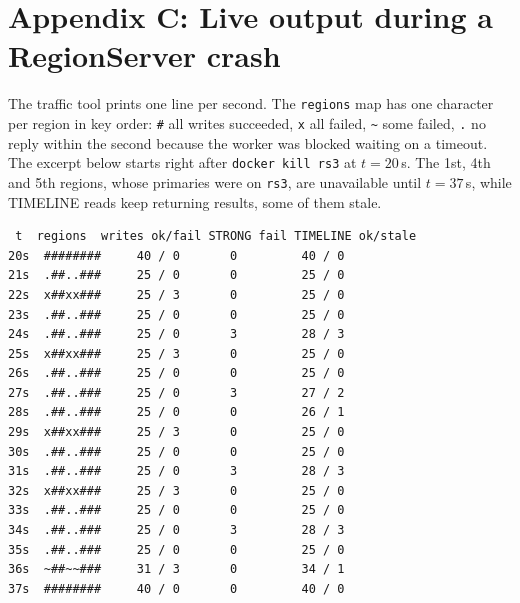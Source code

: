 \documentclass[10pt,twocolumn,letterpaper]{article}
\newcommand{\code}[1]{\texttt{\small #1}}
\begin{document}
\section*{Appendix C: Live output during a RegionServer crash}
The traffic tool prints one line per second. The \code{regions} map has one character per region in key order: \code{\#} all writes succeeded, \code{x} all failed, \code{\~{}} some failed, \code{.} no reply within the second because the worker was blocked waiting on a timeout. The excerpt below starts right after \code{docker kill rs3} at $t{=}20$\,s. The 1st, 4th and 5th regions, whose primaries were on \code{rs3}, are unavailable until $t{=}37$\,s, while TIMELINE reads keep returning results, some of them stale.
\begin{footnotesize}
\begin{verbatim}
 t  regions  writes ok/fail STRONG fail TIMELINE ok/stale
20s  ########     40 / 0       0         40 / 0
21s  .##..###     25 / 0       0         25 / 0
22s  x##xx###     25 / 3       0         25 / 0
23s  .##..###     25 / 0       0         25 / 0
24s  .##..###     25 / 0       3         28 / 3
25s  x##xx###     25 / 3       0         25 / 0
26s  .##..###     25 / 0       0         25 / 0
27s  .##..###     25 / 0       3         27 / 2
28s  .##..###     25 / 0       0         26 / 1
29s  x##xx###     25 / 3       0         25 / 0
30s  .##..###     25 / 0       0         25 / 0
31s  .##..###     25 / 0       3         28 / 3
32s  x##xx###     25 / 3       0         25 / 0
33s  .##..###     25 / 0       0         25 / 0
34s  .##..###     25 / 0       3         28 / 3
35s  .##..###     25 / 0       0         25 / 0
36s  ~##~~###     31 / 3       0         34 / 1
37s  ########     40 / 0       0         40 / 0
\end{verbatim}
\end{footnotesize}

\begingroup
\small


\endgroup
\end{document}
